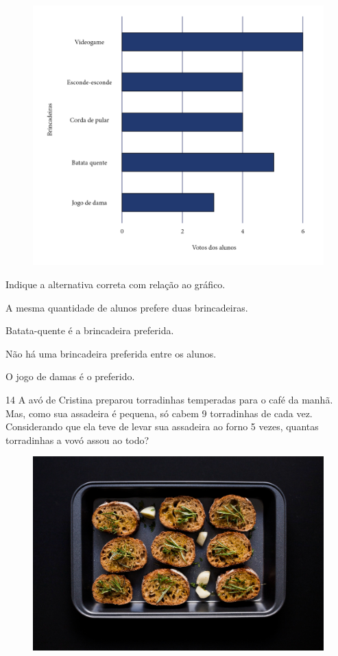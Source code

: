 \begin{figure}[htpb!]
\includegraphics[width=\textwidth]{./media/image158.png}
\end{figure}

Indique a alternativa correta com relação ao gráfico.

\begin{escolha}
\item A mesma quantidade de alunos prefere duas brincadeiras.

\item Batata-quente é a brincadeira preferida.

\item Não há uma brincadeira preferida entre os alunos.

\item O jogo de damas é o preferido.
\end{escolha}

\pagebreak
\num{14} A avó de Cristina preparou torradinhas temperadas para o café da manhã.
Mas, como sua assadeira é pequena, só cabem 9 torradinhas de cada vez.
Considerando que ela teve de levar sua assadeira ao forno 5 vezes,
quantas torradinhas a vovó assou ao todo?

\begin{figure}[htpb!]
\centering
\includegraphics[width=.5\textwidth]{./media/image159.png}
\end{figure}

